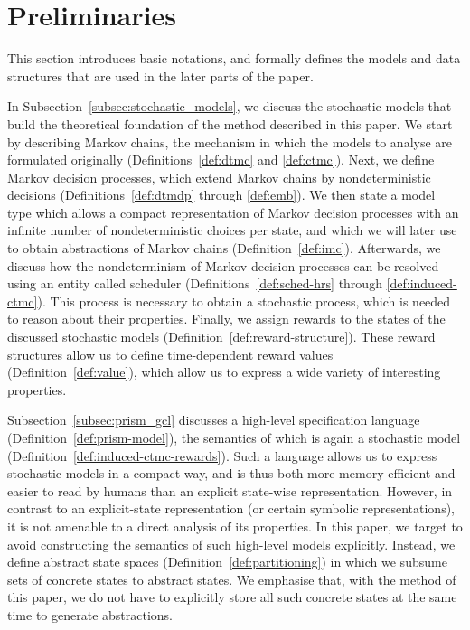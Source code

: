 \documentclass[10pt,twocolumn]{article}
\begin{document}
\section{Preliminaries}
\label{sec:preliminaries}
\noindent This section introduces basic notations, and formally defines the
models and data structures that are used in the later parts of the
paper.

In Subsection~\ref{subsec:stochastic_models}, we discuss the stochastic models that build the theoretical foundation of the method described in this paper.
We start by describing Markov chains, the mechanism in which the models to analyse are formulated originally (Definitions~\ref{def:dtmc} and \ref{def:ctmc}).
Next, we define Markov decision processes, which extend Markov chains by nondeterministic decisions (Definitions~\ref{def:dtmdp} through \ref{def:emb}).
We then state a model type which allows a compact representation of Markov decision processes with an infinite number of nondeterministic choices per
state, and which we will later use to obtain abstractions of Markov chains (Definition~\ref{def:imc}).
Afterwards, we discuss how the nondeterminism of Markov decision processes can be resolved using an entity called scheduler (Definitions~\ref{def:sched-hrs} through \ref{def:induced-ctmc}). 
This process is necessary to obtain a stochastic process, which is needed to reason about their properties.
Finally, we assign rewards to the states of the discussed stochastic models (Definition~\ref{def:reward-structure}).
These reward structures allow us to define time-dependent reward values (Definition~\ref{def:value}), which allow us to express a wide variety of interesting properties.

Subsection~\ref{subsec:prism_gcl} discusses a high-level specification language (Definition~\ref{def:prism-model}), the semantics of which is again a stochastic model (Definition~\ref{def:induced-ctmc-rewards}).
Such a language allows us to express stochastic models in a compact way, and is thus both more memory-efficient and easier to read by humans than an explicit state-wise representation.
However, in contrast to an explicit-state representation (or certain symbolic representations), it is not amenable to a direct analysis of its properties.
In this paper, we target to avoid constructing the semantics of such high-level models explicitly.
Instead, we define abstract state spaces (Definition~\ref{def:partitioning}) in which we subsume sets of concrete states to abstract states.
We emphasise that, with the method of this paper, we do not have to explicitly store all such concrete states at the same time to generate abstractions.
\end{document}
